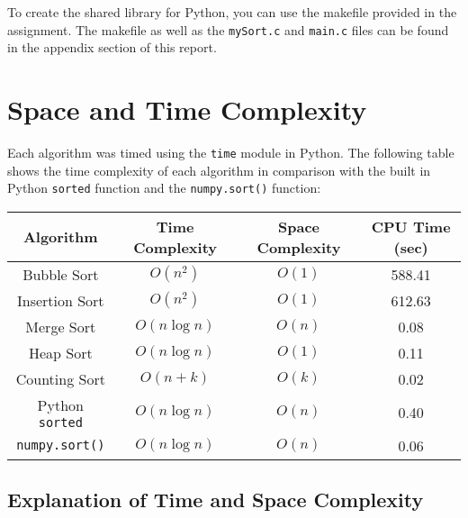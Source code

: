 \documentclass[12pt]{article}
\begin{document}
To create the shared library for Python, you can use the makefile provided in the assignment.
The makefile as well as the \texttt{mySort.c} and \texttt{main.c} files can be found in the appendix section of this report.

\section{Space and Time Complexity}

Each algorithm was timed using the \texttt{time} module in Python.
The following table shows the time complexity of each algorithm in comparison with the built in Python \texttt{sorted} function and the \texttt{numpy.sort()} function:

\begin{center}
	\begin{tabular}{|c|c|c|c|}
	\hline
	\textbf{Algorithm} & \textbf{Time Complexity} & \textbf{Space Complexity} & \textbf{CPU Time (sec)}\\
	\hline
	Bubble Sort & $O(n^2)$ & $O(1)$ & 588.41 \\
	Insertion Sort & $O(n^2)$ & $O(1)$ & 612.63 \\
	Merge Sort & $O(n\log n)$ & $O(n)$ & 0.08 \\
	Heap Sort & $O(n\log n)$ & $O(1)$ & 0.11 \\
	Counting Sort & $O(n + k)$ & $O(k)$ & 0.02 \\
	Python \texttt{sorted} & $O(n\log n)$ & $O(n)$ & 0.40 \\
	\texttt{numpy.sort()} & $O(n\log n)$ & $O(n)$ & 0.06 \\
	\hline
	\end{tabular}
\end{center}

\subsection{Explanation of Time and Space Complexity}
\end{document}
